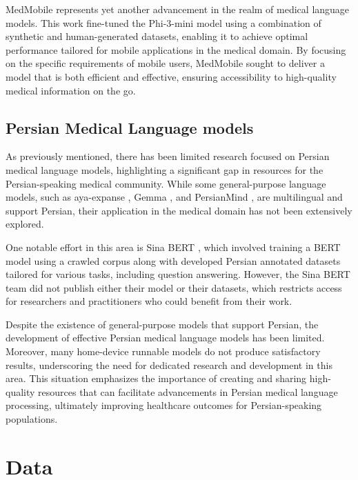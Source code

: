 \documentclass[conference]{IEEEtran}
\begin{document}
MedMobile
\cite{b9}
represents yet another advancement in the realm of medical language models. This work fine-tuned the Phi-3-mini model using a combination of synthetic and human-generated datasets, enabling it to achieve optimal performance tailored for mobile applications in the medical domain. By focusing on the specific requirements of mobile users, MedMobile sought to deliver a model that is both efficient and effective, ensuring accessibility to high-quality medical information on the go.
\subsection{Persian Medical Language models}
As previously mentioned, there has been limited research focused on Persian medical language models, highlighting a significant gap in resources for the Persian-speaking medical community. While some general-purpose language models, such as aya-expanse
\cite{b5}
, Gemma
\cite{b10}
, and PersianMind
\cite{b11}
, are multilingual and support Persian, their application in the medical domain has not been extensively explored.

One notable effort in this area is Sina BERT
\cite{b4}
, which involved training a BERT model using a crawled corpus along with developed Persian annotated datasets tailored for various tasks, including question answering. However, the Sina BERT team did not publish either their model or their datasets, which restricts access for researchers and practitioners who could benefit from their work.

Despite the existence of general-purpose models that support Persian, the development of effective Persian medical language models has been limited. Moreover, many home-device runnable models do not produce satisfactory results, underscoring the need for dedicated research and development in this area. This situation emphasizes the importance of creating and sharing high-quality resources that can facilitate advancements in Persian medical language processing, ultimately improving healthcare outcomes for Persian-speaking populations.

\section{Data}
\end{document}
